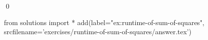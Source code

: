 \begin{ex}
  \label{ex:runtime-of-sum-of-squares}
  
  \mbox{}\\ \\
  \qed
\end{ex}
\begin{python0}
from solutions import *
add(label="ex:runtime-of-sum-of-squares",
    srcfilename='exercises/runtime-of-sum-of-squares/answer.tex') 
\end{python0}                              
